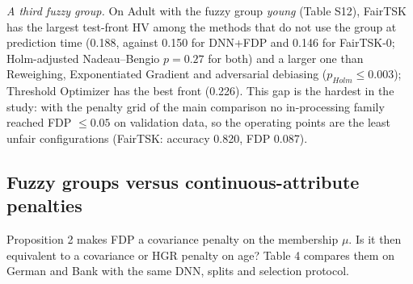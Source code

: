\emph{A third fuzzy group.} On Adult with the fuzzy group \emph{young} (Table S12), FairTSK has the largest test-front HV among the methods that do not use the group at prediction time (0.188, against 0.150 for DNN+FDP and 0.146 for FairTSK-0; Holm-adjusted Nadeau--Bengio \(p = 0.27\) for both) and a larger one than Reweighing, Exponentiated Gradient and adversarial debiasing (\(p_{Holm} \leq 0.003\)); Threshold Optimizer has the best front (0.226). This gap is the hardest in the study: with the penalty grid of the main comparison no in-processing family reached FDP \(\leq 0.05\) on validation data, so the operating points are the least unfair configurations (FairTSK: accuracy 0.820, FDP 0.087).

\hypertarget{fuzzy-groups-versus-continuous-attribute-penalties}{%
\subsection{Fuzzy groups versus continuous-attribute penalties}\label{fuzzy-groups-versus-continuous-attribute-penalties}}

Proposition 2 makes FDP a covariance penalty on the membership \(\mu\). Is it then equivalent to a covariance or HGR penalty on age? Table 4 compares them on German and Bank with the same DNN, splits and selection protocol.

